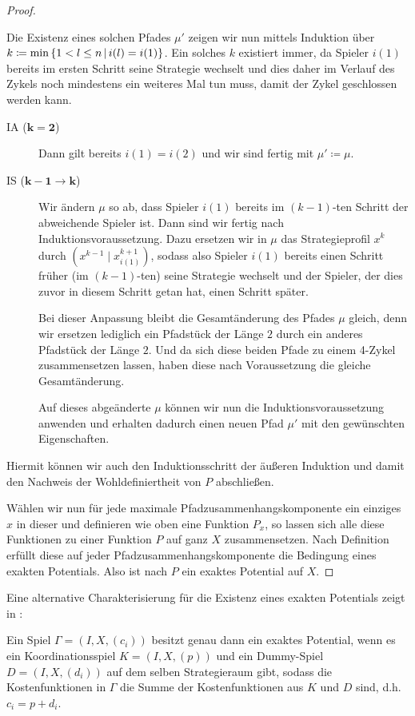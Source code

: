 \begin{proof}
\begin{description}
		Die Existenz eines solchen Pfades $\mu'$ zeigen wir nun mittels Induktion über $k \coloneqq \min\left\{1 < l \leq n \,\middle|\, i(l) = i(1)\right\}$. Ein solches $k$ existiert immer, da Spieler $i(1)$ bereits im ersten Schritt seine Strategie wechselt und dies daher im Verlauf des Zykels noch mindestens ein weiteres Mal tun muss, damit der Zykel geschlossen werden kann.
		\begin{description}
			\item[IA ($\bm{k=2}$)] Dann gilt bereits $i(1)=i(2)$ und wir sind fertig mit $\mu' \coloneqq \mu$.
			\item[IS ($\bm{k-1\to k}$)] Wir ändern $\mu$ so ab, dass Spieler $i(1)$ bereits im $(k-1)$-ten Schritt der abweichende Spieler ist. Dann sind wir fertig nach Induktionsvoraussetzung. Dazu ersetzen wir in $\mu$ das Strategieprofil $x^k$ durch $(x^{k-1} \mid x^{k+1}_{i(1)})$, sodass also Spieler $i(1)$ bereits einen Schritt früher (im $(k-1)$-ten) seine Strategie wechselt und der Spieler, der dies zuvor in diesem Schritt getan hat, einen Schritt später.
			
			Bei dieser Anpassung bleibt die Gesamtänderung des Pfades $\mu$ gleich, denn wir ersetzen lediglich ein Pfadstück der Länge $2$ durch ein anderes Pfadstück der Länge $2$. Und da sich diese beiden Pfade zu einem 4-Zykel zusammensetzen lassen, haben diese nach Voraussetzung die gleiche Gesamtänderung.
			
			Auf dieses abgeänderte $\mu$ können wir nun die Induktionsvoraussetzung anwenden und erhalten dadurch einen neuen Pfad $\mu'$ mit den gewünschten Eigenschaften.
		\end{description}
		Hiermit können wir auch den Induktionsschritt der äußeren Induktion und damit den Nachweis der Wohldefiniertheit von $P$ abschließen. 
	\end{description}	
	Wählen wir nun für jede maximale Pfadzusammenhangskomponente ein einziges $x$ in dieser und definieren wie oben eine Funktion $P_x$, so lassen sich alle diese Funktionen zu einer Funktion $P$ auf ganz $X$ zusammensetzen. Nach Definition erfüllt diese auf jeder Pfadzusammenhangskomponente die Bedingung eines exakten Potentials. Also ist nach  $P$ ein exaktes Potential auf $X$.
\end{proof}

Eine alternative Charakterisierung für die Existenz eines exakten Potentials zeigt \citeauthor{KoordDummy} in \cite[Theorem 2.1]{KoordDummy}:

\begin{satz}\label{satz:CharExPotAlt}
	Ein Spiel $\Gamma = (I, X, (c_i))$ besitzt genau dann ein exaktes Potential, wenn es ein Koordinationsspiel $K = (I, X, (p))$ und ein Dummy-Spiel $D = (I, X, (d_i))$ auf dem selben Strategieraum gibt, sodass die Kostenfunktionen in $\Gamma$ die Summe der Kostenfunktionen aus $K$ und $D$ sind, d.h. $c_i = p + d_i$.
\end{satz}

